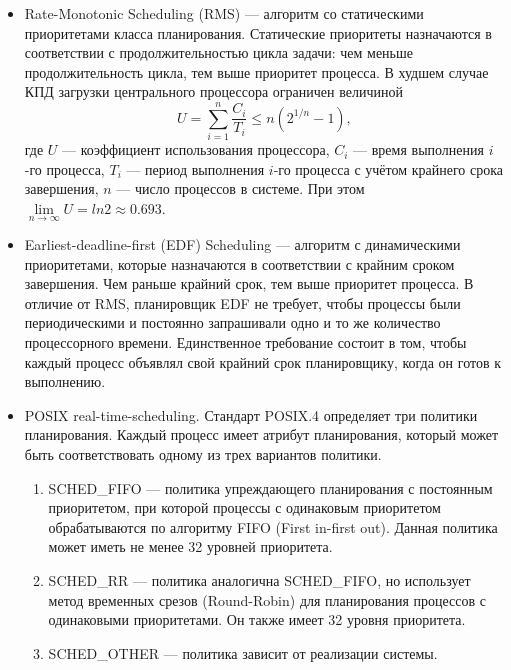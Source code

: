 \begin{itemize}[label*=---]
	\item Rate-Monotonic Scheduling (RMS) --- алгоритм со статическими приоритетами класса планирования. Статические приоритеты назначаются в соответствии с продолжительностью цикла задачи: чем меньше продолжительность цикла, тем выше приоритет процесса. В худшем случае КПД загрузки центрального процессора ограничен величиной
	\begin{equation}
		U=\sum_{i=1}^{n}\frac{C_i}{T_i} \le n(2^{1/n}-1),
	\end{equation}
	где $U$ --- коэффициент использования процессора, $C_i$ --- время выполнения $i$-го процесса, $T_i$ --- период выполнения $i$-го процесса с учётом крайнего срока завершения, $n$ --- число процессов в системе. При этом $\lim\limits_{n \to \infty }U=ln2\approx0.693$. \cite{rms}\cite{habr}
	
	\item Earliest-deadline-first (EDF) Scheduling --- алгоритм с динамическими приоритетами, которые назначаются в соответствии с крайним сроком завершения. Чем раньше крайний срок, тем выше приоритет процесса. В отличие от RMS, планировщик EDF не требует, чтобы процессы были периодическими и постоянно запрашивали одно и то же количество процессорного времени. Единственное требование состоит в том, чтобы каждый процесс объявлял свой крайний срок планировщику, когда он готов к выполнению.\cite{habr}
	\item POSIX real-time-scheduling. Стандарт POSIX.4 определяет три политики планирования. Каждый процесс имеет атрибут планирования, который может быть соответствовать одному из трех вариантов политики. \cite{posix}
	\begin{enumerate}[label*=\arabic*.]
		\item SCHED\_FIFO --- политика упреждающего планирования с постоянным приоритетом, при которой процессы с одинаковым приоритетом обрабатываются по алгоритму FIFO (First in-first out). Данная политика может иметь не менее 32 уровней приоритета.
		\item SCHED\_RR --- политика аналогична SCHED\_FIFO, но использует метод временных срезов (Round-Robin) для планирования процессов с одинаковыми приоритетами. Он также имеет 32 уровня приоритета.
		\item SCHED\_OTHER --- политика зависит от реализации системы.
	\end{enumerate}
\end{itemize}




